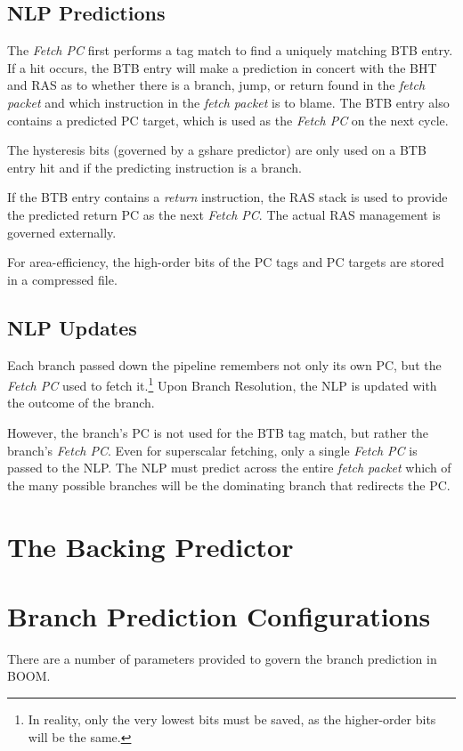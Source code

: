 \subsection{NLP Predictions}

The {\em Fetch PC} first performs a tag match to find a uniquely matching BTB entry.  If a hit occurs, the BTB entry will make a prediction in concert with the BHT and RAS as to whether there is a branch, jump, or return found in the {\em fetch packet} and which instruction in the {\em fetch packet} is to blame.  The BTB entry also contains a predicted PC target, which is used as the {\em Fetch PC} on the next cycle.  



The hysteresis bits (governed by a gshare predictor) are only used on a BTB entry hit and if the predicting instruction is a branch. 

If the BTB entry contains a {\em return} instruction, the RAS stack is used to provide the predicted return PC as the next {\em Fetch PC}. The actual RAS management is governed externally. 

For area-efficiency, the high-order bits of the PC tags and PC targets are stored in a compressed file.


\subsection{NLP Updates}

Each branch passed down the pipeline remembers not only its own PC, but the {\em Fetch PC} used to fetch it.\footnote{In reality, only the very lowest bits must be saved, as the higher-order bits will be the same.}  Upon Branch Resolution, the NLP is updated with the outcome of the branch.  

However, the branch's PC is not used for the BTB tag match, but rather the branch's {\em Fetch PC}.  Even for superscalar fetching, only a single {\em Fetch PC} is passed to the NLP. The NLP must predict across the entire {\em fetch packet} which of the many possible branches will be the dominating branch that redirects the PC. 


\section{The Backing Predictor}


\section{Branch Prediction Configurations}

There are a number of parameters provided to govern the branch prediction in BOOM.

 
